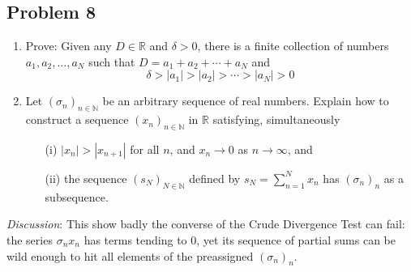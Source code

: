 \documentclass{article}
\newcommand{\N}{{\mathbb N}}
\newcommand{\R}{{\mathbb R}}
\begin{document}
{\subsection*{Problem 8}
{\it
\begin{enumerate}
	\item Prove: Given any $D \in \R$ and $\delta > 0$,
		there is a finite collection of numbers $a_1,a_2,\dots,a_N$
		such that $D = a_1 + a_2 + \cdots + a_N$ and
		\[
			\delta > |a_1| > |a_2| > \cdots > |a_N| > 0
		\]
	\item Let $(\sigma_n)_{n\in\N}$ be an arbitrary sequence of real numbers.
		Explain how to construct a sequence $(x_n)_{n\in\N}$ in $\R$ satisfying, simultaneously
		\begin{enumerate}
			\item[(i)] $|x_n| > |x_{n+1}|$ for all $n$, and $x_n \to 0$ as $n \to \infty$, and
			\item[(ii)] the sequence $(s_N)_{N\in\N}$ defined by
				$s_N = \sum_{n=1}^N x_n$ has $(\sigma_n)_n$ as a subsequence.
		\end{enumerate}
\end{enumerate}
\emph{Discussion}: This show badly the converse of the Crude Divergence Test can fail:
the series $\sigma_n x_n$ has terms tending to $0$,
yet its sequence of partial sums can be wild enough to
hit all elements of the preassigned $(\sigma_n)_n$.

}}
\end{document}
